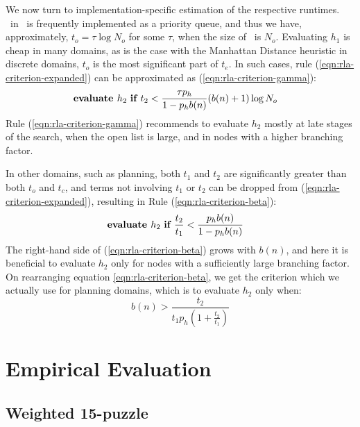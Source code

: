 We now turn to implementation-specific estimation of the respective runtimes.
\OPEN~in \astar~is frequently implemented as a priority queue, and thus we have, approximately,
$t_o=\tau \log N_o$ for some $\tau$, when the size of \OPEN~is $N_o$.
Evaluating $h_1$ is cheap in many domains, as is the
case with the Manhattan Distance heuristic in discrete domains, $t_o$ is the most significant part of
$t_{e}$. In such cases,
rule (\ref{eqn:rla-criterion-expanded}) can be approximated as (\ref{eqn:rla-criterion-gamma}):
\begin{align}
  &\mbox{\bf evaluate }h_2\mbox{ \bf if } t_2 < \frac {\tau p_h} {1-p_hb(n)} (b(n)+1)\log N_o
\label{eqn:rla-criterion-gamma}
\end{align}
Rule (\ref{eqn:rla-criterion-gamma})
recommends to evaluate $h_2$ mostly at late stages of the search,
when the open list is large, and in nodes with a higher branching factor.

In other domains, such as planning, both $t_1$ and $t_2$ are
significantly greater than both $t_o$ and $t_c$, and terms
not involving $t_1$ or $t_2$ can be dropped from
(\ref{eqn:rla-criterion-expanded}), resulting in Rule (\ref{eqn:rla-criterion-beta}):
\begin{align}
  &\mbox{\bf evaluate }h_2\mbox{ \bf if } \frac{t_2}{t_1} < \frac {p_hb(n)} {1-p_hb(n)}
\label{eqn:rla-criterion-beta}
\end{align}
The right-hand side of (\ref{eqn:rla-criterion-beta}) grows with $b(n)$, and here it is beneficial to evaluate $h_2$
only for nodes with a sufficiently large branching factor. On rearranging equation \ref{eqn:rla-criterion-beta},
we get the criterion which we actually use for planning domains,
which is to evaluate $h_2$ only when:
\begin{equation}
b(n) > \frac{t_2}{t_1 p_h \left(1 + \frac{t_2}{t_1}\right)}
\label{eqn:rla-planning-rule}
\end{equation}

\section{Empirical Evaluation}
\label{sec:rla-empirical}

\subsection{Weighted 15-puzzle}

